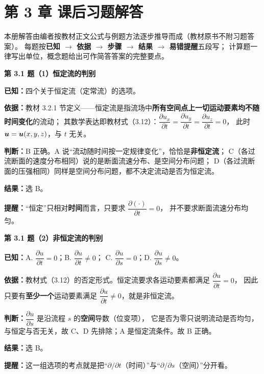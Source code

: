 \chapter*{第 3 章 课后习题解答}

\begin{tishi}
本册解答由编者按教材正文公式与例题方法逐步推导而成（教材原书不附习题答案）。
每题按\textbf{已知 $\to$ 依据 $\to$ 步骤 $\to$ 结果 $\to$ 易错提醒}五段写；
计算题一律写出单位，概念题给出可作简答答案的完整要点。
\end{tishi}

\noindent\textbf{第 3.1 题（1）\quad 恒定流的判别}

\begin{jie}
\textbf{已知：}四个关于恒定流（定常流）的选项。

\textbf{依据：}教材 3.2.1 节定义——恒定流是指流场中\textbf{所有空间点上一切运动要素均不随时间变化}的流动；
其数学表达即教材式（3.12）：$\dfrac{\partial u_x}{\partial t}=\dfrac{\partial u_y}{\partial t}=\dfrac{\partial u_z}{\partial t}=0$，
此时 $\bm{u}=\bm{u}(x,y,z)$，与 $t$ 无关。

\textbf{判断：}B 正确。A 说“流动随时间按一定规律变化”，恰恰是\textbf{非恒定流}；
C（各过流断面的速度分布相同）说的是断面流速分布、是空间分布问题；
D（各过流断面的压强相同）同样是空间分布问题，都不决定流动是否为恒定流。

\textbf{结果：}选 B。

\textbf{提醒：}“恒定”只相对\textbf{时间}而言，只要求 $\dfrac{\partial(\cdot)}{\partial t}=0$，
并不要求断面流速分布均匀。
\end{jie}

\noindent\textbf{第 3.1 题（2）\quad 非恒定流的判别}

\begin{jie}
\textbf{已知：}A. $\dfrac{\partial u}{\partial t}=0$；\quad B. $\dfrac{\partial u}{\partial t}\neq0$；\quad
C. $\dfrac{\partial u}{\partial s}=0$；\quad D. $\dfrac{\partial u}{\partial s}\neq0$。

\textbf{依据：}教材式（3.12）的否定形式。恒定流要求各运动要素都满足 $\dfrac{\partial u}{\partial t}=0$，
因此只要有\textbf{至少一个}运动要素满足 $\dfrac{\partial u}{\partial t}\neq0$，就是非恒定流。

\textbf{判断：}$\dfrac{\partial u}{\partial s}$ 是沿流程 $s$ 的\textbf{空间}导数（位变项），
它是否为零只说明流动是否均匀，与恒定与否无关，故 C、D 先排除；A 是恒定流条件。故 B 正确。

\textbf{结果：}选 B。

\textbf{提醒：}这一组选项的考点就是把“$\partial/\partial t$（时间）”与“$\partial/\partial s$（空间）”分开看。
\end{jie}

